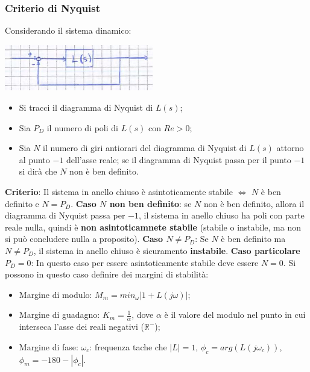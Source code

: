 \begin{landscape}
    \subsubsection*{Criterio di Nyquist}
    Considerando il sistema dinamico:
    \begin{center}
        \includegraphics[height=2cm]{../formulario/img1.JPG}
    \end{center}
    \begin{itemize}
        \item Si tracci il diagramma di Nyquist di $L(s)$;
        \item Sia $P_D$ il numero di poli di $L(s)$ con $Re > 0$;
        \item Sia $N$ il numero di giri antiorari del diagramma di Nyquist di $L(s)$ attorno al punto $-1$ dell'asse reale; se il diagramma di Nyquist passa per il punto $-1$ si dirà che $N$ non è ben definito.
    \end{itemize}
    \textbf{Criterio}:\newline
    Il sistema in anello chiuso è asintoticamente stabile $\Leftrightarrow$ $N$ è ben definito e $N = P_D$.\newline
    \newline
    \textbf{Caso $N$ non ben definito}:\newline
    se $N$ non è ben definito, allora il diagramma di Nyquist passa per $-1$, il sistema in anello chiuso ha poli con parte reale nulla, quindi è \textbf{non asintoticamnete stabile} (stabile o instabile, ma non si può concludere nulla a proposito).\newline
    \newline
    \textbf{Caso $N \neq P_D$}:\newline
    Se $N$ è ben definito ma $N\neq P_D$, il sistema in anello chiuso è sicuramento \textbf{instabile}.\newline
    \newline
    \textbf{Caso particolare $P_D = 0$}:\newline
    In questo caso per essere asintoticamente stabile deve essere $N = 0$. Si possono in questo caso definire dei margini di stabilità:
    \begin{itemize}
        \item Margine di modulo: $M_m = min_{\omega} | 1 + L(j \omega)|$;
        \item Margine di guadagno: $K_m = \frac{1}{\alpha}$, dove $\alpha$ è il valore del modulo nel punto in cui interseca l'asse dei reali negativi ($\mathbb{R}^{-}$);
        \item Margine di fase: $\omega_c$: frequenza tache che $|L| = 1$, $\phi_c = arg(L(j \omega_c))$, $\phi_m = -180 - |\phi_c|$.
    \end{itemize}

\end{landscape}
